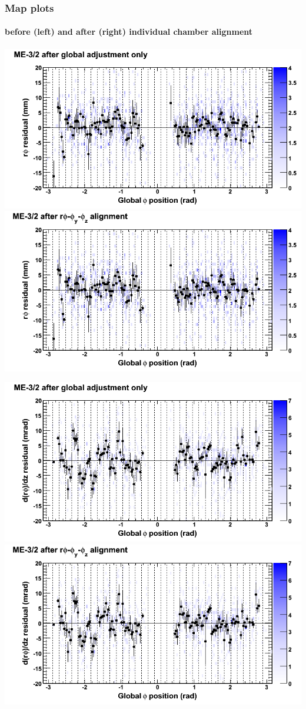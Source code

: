 \documentclass[compress]{beamer}
\begin{document}
\begin{frame}
\frametitle{Map plots}
\framesubtitle{before (left) and after (right) individual chamber alignment}
\includegraphics[width=0.5\linewidth]{ringmapplots_3dof/before_CSCvsphi_mem32_x.png} \includegraphics[width=0.5\linewidth]{ringmapplots_3dof/after_CSCvsphi_mem32_x.png}

\includegraphics[width=0.5\linewidth]{ringmapplots_3dof/before_CSCvsphi_mem32_dxdz.png} \includegraphics[width=0.5\linewidth]{ringmapplots_3dof/after_CSCvsphi_mem32_dxdz.png}
\end{frame}
\end{document}
